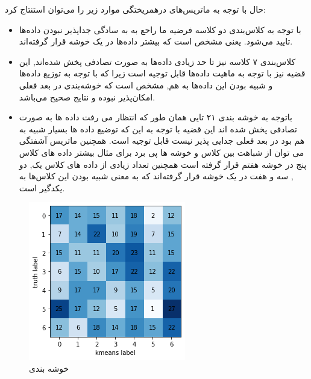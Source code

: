 \documentclass{article}
\begin{document}
حال با توجه به ماتریس‌های درهمریختگی موارد زیر را می‌توان استنتاج کرد:
\begin{itemize}
	\item با توجه به کلاس‌بندی دو کلاسه فرضیه ما راحع به به سادگی جداپذیر نبودن داده‌ها تایید می‌شود. یعنی مشخص است که بیشتر داده‌ها در یک خوشه‌ قرار گرفته‌اند. 
		\item کلاس‌بندی ۷ کلاسه نیز تا حد زیادی داده‌ها به صورت تصادفی پخش شده‌اند, این قضیه نیز با توجه به ماهیت داده‌ها قابل توجیه است زیرا که با توجه به توزیع داده‌ها و شبیه بودن این داده‌ها به هم, مشخص است که خوشه‌بندی در بعد فعلی امکان‌پذیر نبوده و نتایج صحیح می‌باشد.
		\item باتوجه به خوشه بندی ۲۱ تایی همان طور که انتظار می رفت داده ها به صورت تصادفی پخش شده اند این قضیه با توجه به این که توضیع داده ها بسیار شبیه به هم بود در بعد فعلی جدایی پذیر نیست قابل توجیه است. همچنین ماتریس آشفتگی می توان از شباهت بین کلاس و خوشه ها پی برد برای مثال بیشتر داده های کلاس پنج در خوشه هفتم قرار گرفته است همچنین تعداد زیادی از داده های کلاس یک, دو , سه و هفت در یک خوشه قرار گرفته‌اند  که به معنی شبیه بودن این کلاس‌ها به یکدگیر است.
\end{itemize}
\begin{figure}[h]
	\centering
	\includegraphics[width=0.7\linewidth]{Photo/37}
	\caption[خوشه بندی ]{خوشه بندی }
	\label{fig:37}
\end{figure}
\end{document}
